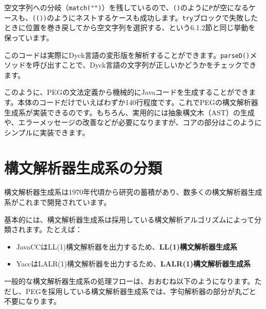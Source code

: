 空文字列への分岐（\texttt{match("")}）を残しているので、\texttt{()}のように\texttt{P}が空になるケースも、\texttt{(())}のようにネストするケースも成功します。\texttt{try}ブロックで失敗したときに位置を巻き戻してから空文字列を選択する、という6.1.2節と同じ挙動を保っています。

このコードは実際にDyck言語の変形版を解析することができます。\texttt{parseD()}メソッドを呼び出すことで、Dyck言語の文字列が正しいかどうかをチェックできます。

このように、PEGの文法定義から機械的にJavaコードを生成することができます。本体のコードだけでいえばわずか140行程度です。これでPEGの構文解析器生成系が実装できるのです。もちろん、実用的には抽象構文木（AST）の生成や、エラーメッセージの改善などが必要になりますが、コアの部分はこのようにシンプルに実装できます。

\hypertarget{chapter6-ux69cbux6587ux89e3ux6790ux5668ux751fux6210ux7cfbux306eux5206ux985e}{%
\section{構文解析器生成系の分類}\label{chapter6-ux69cbux6587ux89e3ux6790ux5668ux751fux6210ux7cfbux306eux5206ux985e}}

構文解析器生成系は1970年代頃から研究の蓄積があり、数多くの構文解析器生成系がこれまで開発されています。

基本的には、構文解析器生成系は採用している構文解析アルゴリズムによって分類されます。たとえば：

\begin{itemize}
\tightlist
\item
  JavaCCはLL(1)構文解析器を出力するため、\textbf{LL(1)構文解析器生成系}
\item
  YaccはLALR(1)構文解析器を出力するため、\textbf{LALR(1)構文解析器生成系}
\end{itemize}

一般的な構文解析器生成系の処理フローは、おおむね以下のようになります。ただし、PEGを採用している構文解析器生成系では、字句解析器の部分が丸ごと不要になります。

